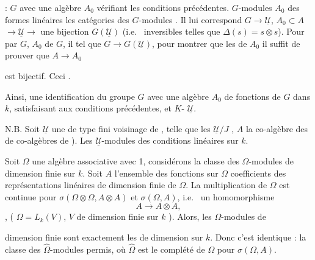 \documentclass[11pt,a4paper]{article}
\begin{document}
 : \ill{} $G$ avec une algèbre $A_{0}$
vérifiant les conditions précédentes. \ill{} $G$-modules \ill{} $A_{0}$ \ill{}
des formes linéaires \ill{} \ill{} les catégories des $G$-modules \ill{}. Il lui
correspond \ill{} $G \to \underline{\mathcal{U}}$, $A_{0} \subset A$ \ill{}
$\to \underline{\mathcal{U}} \to$ \ill{} une bijection \ill{}
$G(\underline{\mathcal{U}})$ (i.e.\ \ill{} inversibles \ill{} telles que
$\Delta(s) = s \otimes s$). Pour \ill{} par $G$, \ill{} $A_{0}$ \ill{} de $G$,
il \ill{} tel que $G \to G(\underline{\mathcal{U}})$, pour montrer que les
\ill{} \ill{} de $A_{0}$ il suffit de prouver que $A \to A_{0}$


est bijectif. Ceci \ill{} \ill{} .

Ainsi, une identification du groupe $G$ avec une algèbre $A_{0}$ de fonctions de
$G$ dans $k$, satisfaisant aux conditions précédentes, et 
\struck{\ill{}} $K$-\ill{} $\underline{\mathcal{U}}$.

N.B. Soit $\underline{\mathcal{U}}$ une \ill{} \ill{} de type fini \ill{} voisinage de \ill{}, telle
que les $\underline{\mathcal{U}}/J$ \ill{}, $A$ \ill{} la co-algèbre des \ill{}
\struck{\ill{}} de \ill{} co-algèbres de \ill{}). Les
$\underline{\mathcal{U}}$-modules \ill{} des conditions 
\ill{} linéaires sur $k$.

Soit $\Omega$ une \struck{\ill{}} algèbre associative avec 1, considérons la
classe des $\Omega$-modules \ill{} de dimension finie sur $k$. Soit $A$
l'ensemble des fonctions sur $\Omega$ \ill{} coefficients des représentations
linéaires \ill{} de dimension finie de $\Omega$. La multiplication de $\Omega$
est continue pour $\sigma(\Omega \otimes \Omega, A \otimes A)$ \ill{} et
$\sigma(\Omega, A)$, i.e.\ \ill{} un homomorphisme
\[ A \to A \otimes A , \]
\ill{}, \ill{} ( \ill{} $\Omega = L_{k}(V)$, $V$ de dimension finie sur $k$ ).
Alors, les $\Omega$-modules \ill{} de


dimension finie sont exactement les  \struck{\ill{}}
\ill{} de dimension \ill{} sur $k$. Donc c'est identique : la classe des
$\hat{\Omega}$-modules permis, où $\hat{\Omega}$ est le complété de $\Omega$
pour $\sigma(\Omega, A)$.

\end{document}
